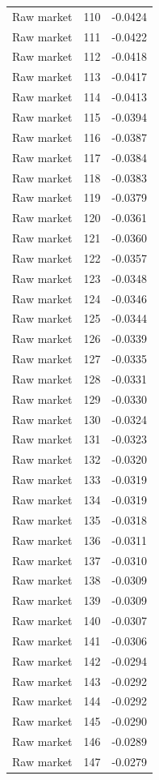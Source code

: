 \begin{table}[htbp]
\begin{tabular}{lll}
Raw market & 110 & -0.0424 \\
Raw market & 111 & -0.0422 \\
Raw market & 112 & -0.0418 \\
Raw market & 113 & -0.0417 \\
Raw market & 114 & -0.0413 \\
Raw market & 115 & -0.0394 \\
Raw market & 116 & -0.0387 \\
Raw market & 117 & -0.0384 \\
Raw market & 118 & -0.0383 \\
Raw market & 119 & -0.0379 \\
Raw market & 120 & -0.0361 \\
Raw market & 121 & -0.0360 \\
Raw market & 122 & -0.0357 \\
Raw market & 123 & -0.0348 \\
Raw market & 124 & -0.0346 \\
Raw market & 125 & -0.0344 \\
Raw market & 126 & -0.0339 \\
Raw market & 127 & -0.0335 \\
Raw market & 128 & -0.0331 \\
Raw market & 129 & -0.0330 \\
Raw market & 130 & -0.0324 \\
Raw market & 131 & -0.0323 \\
Raw market & 132 & -0.0320 \\
Raw market & 133 & -0.0319 \\
Raw market & 134 & -0.0319 \\
Raw market & 135 & -0.0318 \\
Raw market & 136 & -0.0311 \\
Raw market & 137 & -0.0310 \\
Raw market & 138 & -0.0309 \\
Raw market & 139 & -0.0309 \\
Raw market & 140 & -0.0307 \\
Raw market & 141 & -0.0306 \\
Raw market & 142 & -0.0294 \\
Raw market & 143 & -0.0292 \\
Raw market & 144 & -0.0292 \\
Raw market & 145 & -0.0290 \\
Raw market & 146 & -0.0289 \\
Raw market & 147 & -0.0279 \\

\end{tabular}
\end{table}
